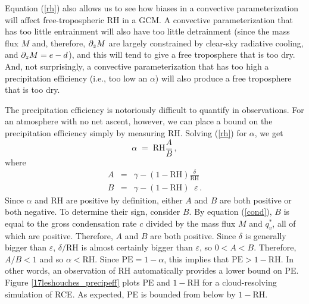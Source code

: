 \documentclass[12pt]{article}
\newcommand{\rh}{{\text{RH}}}
\newcommand{\pe}{{\text{PE}}}
\begin{document}
Equation (\ref{rh}) also allows us to see how biases in a convective parameterization will affect free-tropospheric RH in a GCM.  A convective parameterization that has too little entrainment will also have too little detrainment (since the mass flux $M$ and, therefore, $\partial_z M$ are largely constrained by clear-sky radiative cooling, and $\partial_z M = e - d$), and this will tend to give a free troposphere that is too dry.  And, not surprisingly, a convective parameterization that has too high a precipitation efficiency (i.e., too low an $\alpha$) will also produce a free troposphere that is too dry.


The precipitation efficiency is notoriously difficult to quantify in observations.  For an atmosphere with no net ascent, however, we can place a bound on the precipitation efficiency simply by measuring RH.  Solving (\ref{rh}) for $\alpha$, we get
\begin{equation}
\alpha \; = \; \rh \frac{A}{B} \, , \label{alpha_rh_A_B}
\end{equation}
where
\begin{eqnarray}
A &=& \gamma - (1-\rh) \frac{\delta}{\rh} \label{a_num} \\
B &=& \gamma - (1-\rh) \;\; \varepsilon \, . \label{b_den}
\end{eqnarray}
Since $\alpha$ and RH are positive by definition, either $A$ and $B$ are both positive or both negative.  To determine their sign, consider $B$.  By equation (\ref{cond}), $B$ is equal to the gross condensation rate $c$ divided by the mass flux $M$ and $q_v^*$, all of which are positive.  Therefore, $A$ and $B$ are both positive.  Since $\delta$ is generally bigger than $\varepsilon$, $\delta/\rh$ is almost certainly bigger than $\varepsilon$, so $0 < A < B$.  Therefore, $A/B < 1$ and so $\alpha < \rh$.  Since $\pe = 1-\alpha$, this implies that $\pe > 1-\rh$.  In other words, an observation of RH automatically provides a lower bound on PE.  Figure \ref{17leshouches_precipeff} plots PE and $1-\rh{}$ for a cloud-resolving simulation of RCE.  As expected, PE is bounded from below by $1-\rh{}$.
\end{document}
